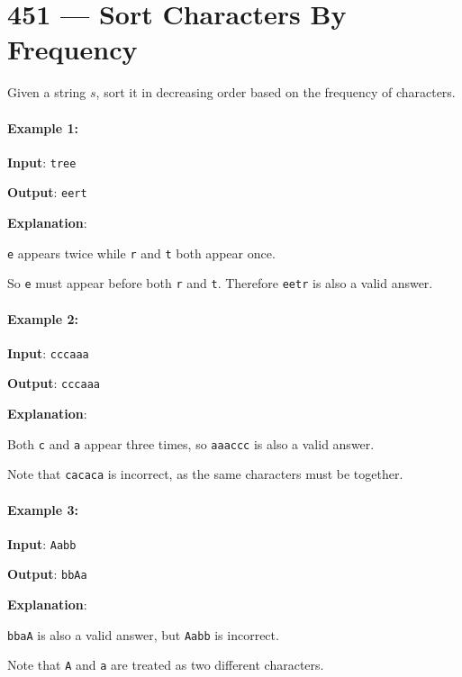 \section{451 --- Sort Characters By Frequency}
Given a string $s$, sort it in decreasing order based on the frequency of characters.

\paragraph{Example 1:}

\begin{flushleft}
\textbf{Input}: \texttt{tree}

\textbf{Output}: \texttt{eert}

\textbf{Explanation}:

\texttt{e} appears twice while \texttt{r} and \texttt{t} both appear once.

So \texttt{e} must appear before both \texttt{r} and \texttt{t}. Therefore \texttt{eetr} is also a valid answer.

\end{flushleft}

\paragraph{Example 2:}

\begin{flushleft}
\textbf{Input}: \texttt{cccaaa}

\textbf{Output}: \texttt{cccaaa}

\textbf{Explanation}:

Both \texttt{c} and \texttt{a} appear three times, so \texttt{aaaccc} is also a valid answer.

Note that \texttt{cacaca} is incorrect, as the same characters must be together.

\end{flushleft}


\paragraph{Example 3:}

\begin{flushleft}
\textbf{Input}: \texttt{Aabb}

\textbf{Output}: \texttt{bbAa}

\textbf{Explanation}:

\texttt{bbaA} is also a valid answer, but \texttt{Aabb} is incorrect.

Note that \texttt{A} and \texttt{a} are treated as two different characters.
\end{flushleft}

